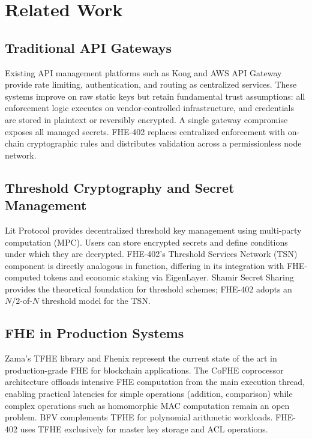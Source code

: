 \documentclass[conference]{IEEEtran}
\begin{document}
\section{Related Work}
\label{sec:related}

\subsection{Traditional API Gateways}
Existing API management platforms such as Kong \cite{kong} and AWS API Gateway \cite{aws_apigw}
provide rate limiting, authentication, and routing as centralized services. These systems
improve on raw static keys but retain fundamental trust assumptions: all enforcement logic
executes on vendor-controlled infrastructure, and credentials are stored in plaintext or
reversibly encrypted. A single gateway compromise exposes all managed secrets. FHE-402
replaces centralized enforcement with on-chain cryptographic rules and distributes validation
across a permissionless node network.

\subsection{Threshold Cryptography and Secret Management}
Lit Protocol \cite{lit_protocol} provides decentralized threshold key management using
multi-party computation (MPC). Users can store encrypted secrets and define conditions
under which they are decrypted. FHE-402's Threshold Services Network (TSN) component
is directly analogous in function, differing in its integration with FHE-computed tokens
and economic staking via EigenLayer. Shamir Secret Sharing \cite{shamir} provides the
theoretical foundation for threshold schemes; FHE-402 adopts an $N/2$-of-$N$ threshold
model for the TSN.

\subsection{FHE in Production Systems}
Zama's TFHE library \cite{zama_tfhe} and Fhenix \cite{fhenix} represent the
current state of the art in production-grade FHE for blockchain applications. The CoFHE
coprocessor architecture \cite{cofhe} offloads intensive FHE computation from the main
execution thread, enabling practical latencies for simple operations (addition, comparison)
while complex operations such as homomorphic MAC computation remain an open problem.
BFV \cite{bfv} complements TFHE for polynomial arithmetic workloads. FHE-402 uses TFHE
exclusively for master key storage and ACL operations.
\end{document}

